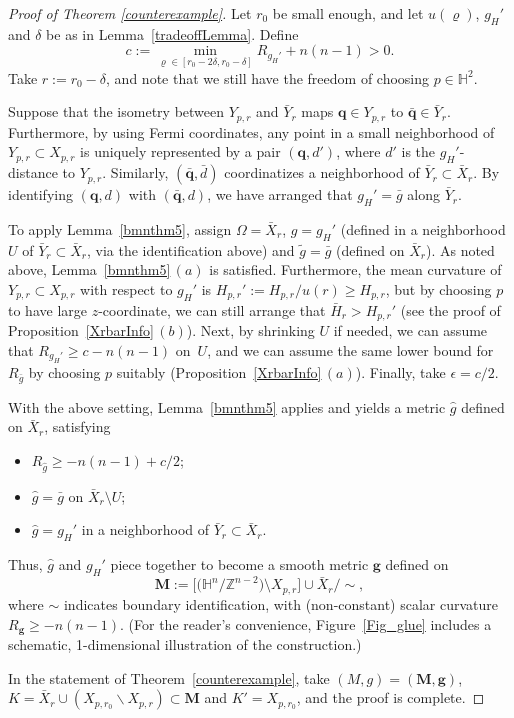 \documentclass[11pt]{article}
\numberwithin{equation}{section}
\numberwithin{equation}{section}
\def\H{\mathbb{H}}
\def\Z{\mathbb{Z}}
\def\bs{\boldsymbol}
\def\setdiff{\backslash}
\begin{document}
\begin{proof}[Proof of Theorem \ref{counterexample}]
Let $r_0$ be small enough, and let $u(\varrho)$, $g_H'$ and $\delta$ be as in
Lemma~\ref{tradeoffLemma}. Define
\[
	c:= \min_{\varrho\in [r_0 - 2\delta, r_0 - \delta]} R_{g_H'} + n(n-1) >0.
\]	
Take $r := r_0 - \delta$, and note that we still have the freedom of
choosing $p\in \H^2$.

Suppose that the isometry between $Y_{p,r}$ and $\bar Y_r$
maps $\bs{q}\in Y_{p,r}$ to $\bar{\bs{q}}\in \bar Y_r$.
Furthermore, by using Fermi coordinates, any point in a small neighborhood of
$Y_{p,r}\subset X_{p,r}$ is uniquely represented by a pair
$(\bs{q}, d')$, where $d'$ is the $g_{H}'$-distance to $Y_{p,r}$.
Similarly, $(\bar{\bs{q}}, \bar d)$
coordinatizes a neighborhood of $\bar Y_r\subset \bar X_r$.
By identifying $(\bs{q}, d)$ with $(\bar {\bs q}, d)$, we have arranged that
$g_H' = \bar g$ along $\bar Y_{r}$.

To apply Lemma~\ref{bmnthm5}, assign $\Omega = \bar X_r$, $g = g_{H}'$ (defined
in a neighborhood $U$ of $\bar Y_r\subset\bar X_r$, via the identification above) and $\tilde g = \bar g$ (defined
on $\bar X_r$).
As noted above, Lemma~\ref{bmnthm5}\,$(a)$ is satisfied.
Furthermore, the mean curvature of $Y_{p,r}\subset X_{p,r}$ with respect to
$g_{H}'$ is $H_{p,r}':=H_{p,r}/u(r)\ge H_{p,r}$, but by choosing $p$ to have
large $z$-coordinate, we can still
arrange that $\bar H_r > H_{p,r}'$ (see the proof of Proposition~\ref{XrbarInfo}\,$(b)$).
Next, by shrinking $U$ if needed, we can assume that $R_{g_H'} \ge c - n(n-1)$ on~$U$, and we can assume the same lower bound for $R_{\bar g}$ by choosing $p$ suitably (Proposition~\ref{XrbarInfo}\,$(a)$).
Finally, take $\epsilon = c/2$.

With the above setting, Lemma~\ref{bmnthm5} applies and yields a metric
$\hat g$ defined on $\bar X_r$, satisfying
\begin{itemize}\itemsep=0pt
 	\item $R_{\hat g}\ge -n(n-1)+ c/2$;
	\item $\hat g = \bar g$ on $\bar X_r \setminus U$;
	\item $\hat g = g_H'$ in a neighborhood of $\bar Y_r\subset \bar X_r$.
\end{itemize}
Thus, $\hat g$ and $g_H'$ piece together to become a smooth metric
$\bs{g}$ defined  on
\[
	 \bs{M}:=\bigl[\big(\H^n/\Z^{n-2}\big)\setminus X_{p,r}\bigr] \cup \bar X_r/{\sim},
\]
where $\sim$
indicates boundary identification,
with (non-constant) scalar curvature
$R_{\bs{g}}\ge -n(n-1)$.
(For the reader's convenience, Figure~\ref{Fig_glue} includes a schematic,
1-dimensional illustration of the construction.)

In the statement of Theorem~\ref{counterexample},
take $(M,g) = (\bs{M}, \bs{g})$, $K = \bar X_r \cup (X_{p,r_0}\setdiff X_{p,r})\subset \bs{M}$
and $K' = X_{p,r_0}$, and the proof is complete.
\end{proof}
\end{document}

